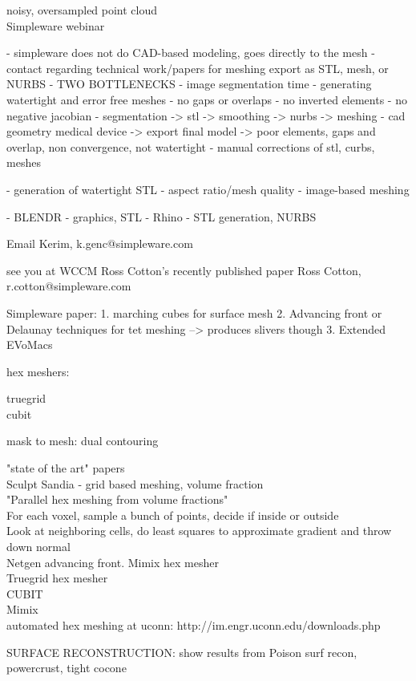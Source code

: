 noisy, oversampled point cloud\\


Simpleware webinar

- simpleware does not do CAD-based modeling, goes directly to the mesh
- contact regarding technical work/papers for meshing
export as STL, mesh, or NURBS
- TWO BOTTLENECKS
  - image segmentation time
  - generating watertight and error free meshes
    - no gaps or overlaps 
    - no inverted elements 
    - no negative jacobian
- segmentation -> stl -> smoothing -> nurbs -> meshing -  cad geometry medical device -> export final model -> poor elements, gaps and overlap, non convergence, not watertight
- manual corrections of stl, curbs, meshes

- generation of watertight STL
- aspect ratio/mesh quality
- image-based meshing

- BLENDR - graphics, STL
- Rhino - STL generation, NURBS

Email Kerim, k.genc@simpleware.com

see you at WCCM
Ross Cotton’s recently published paper
Ross Cotton, r.cotton@simpleware.com

Simpleware paper:
1. marching cubes for surface mesh
2. Advancing front or Delaunay techniques for tet meshing --> produces slivers though
3. Extended EVoMacs

hex meshers:

truegrid\\
cubit

mask to mesh:
dual contouring

"state of the art" papers\\
Sculpt Sandia - grid based meshing, volume fraction \\
"Parallel hex meshing from volume fractions"\\
For each voxel, sample a bunch of points, decide if inside or outside \\
Look at neighboring cells, do least squares to approximate gradient and throw down normal \\

Netgen advancing front. Mimix hex mesher \\

Truegrid hex mesher \\
CUBIT \\
Mimix \\

automated hex meshing at uconn: http://im.engr.uconn.edu/downloads.php


SURFACE RECONSTRUCTION:
show results from Poison surf recon, powercrust, tight cocone \\

